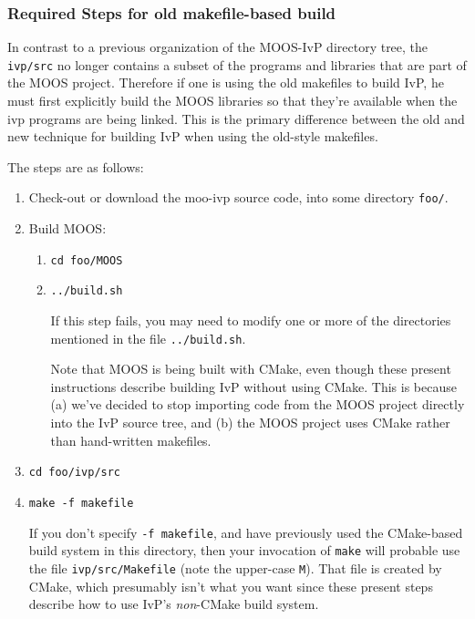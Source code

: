 \documentclass[letterpaper,10pt]{article}
\begin{document}
\subsubsection{Required Steps for old makefile-based build}
In contrast to a previous organization of the MOOS-IvP directory tree, the
\verb|ivp/src| no longer contains a subset of the programs and libraries that are
part of the MOOS project.  Therefore if one is using the old makefiles to build
IvP, he must first explicitly build the MOOS libraries so that they're available when
the ivp programs are being linked.  This is the primary difference between the old
and new technique for building IvP when using the old-style makefiles.

The steps are as follows:

\begin{enumerate}
 \item Check-out or download the moo-ivp source code, into some directory \verb|foo/|.
 \item Build MOOS:
 \begin{enumerate}
  \renewcommand{\labelenumii}{\arabic{enumi}.\arabic{enumii}.}
   \item \verb|cd foo/MOOS|
   \item \verb|../build.sh|

	If this step fails, you may need to modify one or more of the directories
	mentioned in the file \verb|../build.sh|.

	Note that MOOS is being built with CMake, even though these present instructions
	describe building IvP without using CMake.  This is because (a) we've decided to
	stop importing code from the MOOS project directly into the IvP source tree, and
	(b) the MOOS project uses CMake rather than hand-written makefiles.

 \end{enumerate}

 \item \verb|cd foo/ivp/src|
 \item \verb|make -f makefile|

	If you don't specify \verb|-f makefile|, and have previously used the
	CMake-based build system in this directory, then your invocation of \verb|make|
	will probable use the file \verb|ivp/src/Makefile| (note the upper-case \verb|M|).
	That file is created by CMake, which presumably isn't what you want since these
	present steps describe how to use IvP's \textit{non}-CMake build system.

\end{enumerate}
\end{document}
